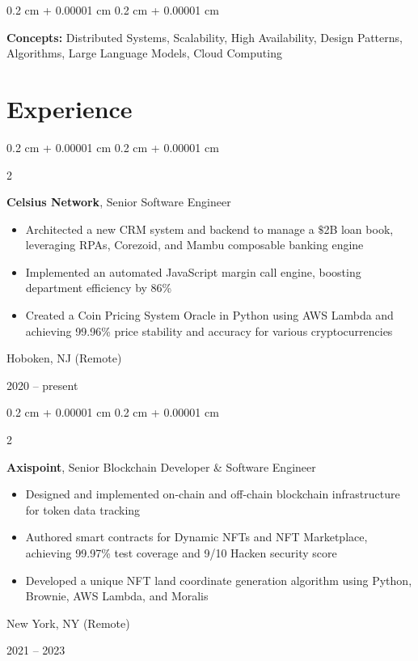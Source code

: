 \documentclass[10pt, letterpaper]{article}
\newenvironment{highlights}{
    \begin{itemize}[
        topsep=0.10 cm,
        parsep=0.10 cm,
        partopsep=0pt,
        itemsep=0pt,
        leftmargin=0.4 cm + 10pt
    ]
}{
    \end{itemize}
} %
\newenvironment{onecolentry}{
    \begin{adjustwidth}{
        0.2 cm + 0.00001 cm
    }{
        0.2 cm + 0.00001 cm
    }
}{
    \end{adjustwidth}
} %
\newenvironment{twocolentry}[2][]{
    \onecolentry
    \def\secondColumn{#2}
    \setcolumnwidth{\fill, 4.5 cm}
    \begin{paracol}{2}
}{
    \switchcolumn \raggedleft \secondColumn
    \end{paracol}
    \endonecolentry
} %
\begin{document}
        \vspace{0.2 cm}

        \begin{onecolentry}
            \textbf{Concepts:} Distributed Systems, Scalability, High Availability, Design Patterns, Algorithms, Large Language Models, Cloud Computing
        \end{onecolentry}


    
    \section{Experience}



        
        \begin{twocolentry}{
            Hoboken, NJ (Remote)

        2020 – present
        }
            \textbf{Celsius Network}, Senior Software Engineer
            \begin{highlights}
                \item Architected a new CRM system and backend to manage a $\mathdollar$2B loan book, leveraging RPAs, Corezoid, and Mambu composable banking engine
                \item Implemented an automated JavaScript margin call engine, boosting department efficiency by 86\%
                \item Created a Coin Pricing System Oracle in Python using AWS Lambda and achieving 99.96\% price stability and accuracy for various cryptocurrencies
            \end{highlights}
        \end{twocolentry}


        \vspace{0.2 cm}

        \begin{twocolentry}{
            New York, NY (Remote)

        2021 – 2023
        }
            \textbf{Axispoint}, Senior Blockchain Developer \& Software Engineer
            \begin{highlights}
                \item Designed and implemented on-chain and off-chain blockchain infrastructure for token data tracking
                \item Authored smart contracts for Dynamic NFTs and NFT Marketplace, achieving 99.97\% test coverage and 9/10 Hacken security score
                \item Developed a unique NFT land coordinate generation algorithm using Python, Brownie, AWS Lambda, and Moralis
            \end{highlights}
        \end{twocolentry}
\end{document}

